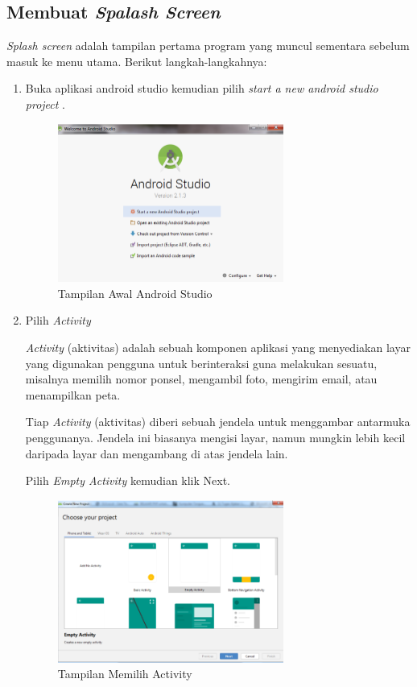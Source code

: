 \subsection{Membuat \textit{Spalash Screen}}
\par \textit{Splash screen} adalah tampilan pertama program yang muncul sementara sebelum masuk ke menu utama. Berikut langkah-langkahnya:
\begin{enumerate}
    \item Buka aplikasi android studio kemudian pilih \textit{start a new android studio project }.
    \begin{figure}[H]
    \centering
    \includegraphics[width=0.7\textwidth]{figures/android23.png}
    \caption{Tampilan Awal Android Studio}
    \label{print}
    \end{figure}
    
    
    \item Pilih \textit{Activity}
    \par \textit{Activity }(aktivitas) adalah sebuah komponen aplikasi yang menyediakan layar yang digunakan pengguna untuk berinteraksi guna melakukan sesuatu, misalnya memilih nomor ponsel, mengambil foto, mengirim email, atau menampilkan peta.

    \par Tiap \textit{ Activity} (aktivitas) diberi sebuah jendela untuk menggambar antarmuka penggunanya. Jendela ini biasanya mengisi layar, namun mungkin lebih kecil daripada layar dan mengambang di atas jendela lain.

    \par Pilih \textit{Empty Activity} kemudian klik Next.
    \begin{figure}[H]
    \centering
    \includegraphics[width=0.7\textwidth]{figures/android24.png}
    \caption{Tampilan Memilih Activity}
    \label{print}
    \end{figure}
    

\end{enumerate}
